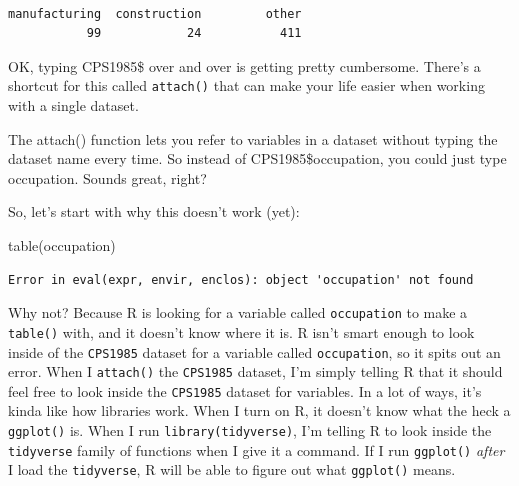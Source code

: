 \documentclass[
  letterpaper,
]{book}
\newenvironment{Shaded}{\begin{snugshade}}{\end{snugshade}}
\newcommand{\FunctionTok}[1]{\textcolor[rgb]{0.28,0.35,0.67}{#1}}
\newcommand{\NormalTok}[1]{\textcolor[rgb]{0.00,0.23,0.31}{#1}}
\newcommand{\SpecialCharTok}[1]{\textcolor[rgb]{0.37,0.37,0.37}{#1}}
\begin{document}
\begin{Shaded}
\end{Shaded}

\begin{verbatim}

manufacturing  construction         other 
           99            24           411 
\end{verbatim}

OK, typing CPS1985\$ over and over is getting pretty cumbersome. There's
a shortcut for this called \texttt{attach()} that can make your life
easier when working with a single dataset.

\begin{tcolorbox}[enhanced jigsaw, colframe=quarto-callout-tip-color-frame, breakable, arc=.35mm, bottomtitle=1mm, bottomrule=.15mm, colbacktitle=quarto-callout-tip-color!10!white, rightrule=.15mm, colback=white, opacityback=0, opacitybacktitle=0.6, coltitle=black, left=2mm, toptitle=1mm, toprule=.15mm, titlerule=0mm, leftrule=.75mm, title=\textcolor{quarto-callout-tip-color}{\faLightbulb}\hspace{0.5em}{Tip from the Helpdesk: To Attach or Not to Attach?}]

The attach() function lets you refer to variables in a dataset without
typing the dataset name every time. So instead of CPS1985\$occupation,
you could just type occupation. Sounds great, right?

So, let's start with why this doesn't work (yet):

\begin{Shaded}
\begin{Highlighting}[]
\FunctionTok{table}\NormalTok{(occupation)}
\end{Highlighting}
\end{Shaded}

\begin{verbatim}
Error in eval(expr, envir, enclos): object 'occupation' not found
\end{verbatim}

Why not? Because R is looking for a variable called \texttt{occupation}
to make a \texttt{table()} with, and it doesn't know where it is. R
isn't smart enough to look inside of the \texttt{CPS1985} dataset for a
variable called \texttt{occupation}, so it spits out an error. When I
\texttt{attach()} the \texttt{CPS1985} dataset, I'm simply telling R
that it should feel free to look inside the \texttt{CPS1985} dataset for
variables. In a lot of ways, it's kinda like how libraries work. When I
turn on R, it doesn't know what the heck a \texttt{ggplot()} is. When I
run \texttt{library(tidyverse)}, I'm telling R to look inside the
\texttt{tidyverse} family of functions when I give it a command. If I
run \texttt{ggplot()} \emph{after} I load the \texttt{tidyverse}, R will
be able to figure out what \texttt{ggplot()} means.


\end{tcolorbox}
\end{document}

